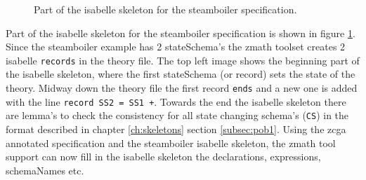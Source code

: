 \begin{figure}[H]
    \hfill
    \hfill
    \hfill
    \caption{Part of the isabelle skeleton for the steamboiler specification.\label{fig:steamisaskel}}
\end{figure}

Part of the isabelle skeleton for the steamboiler specification is shown in
figure \ref{fig:steamisaskel}. Since the steamboiler example has 2 stateSchema's
the \gls{zmath} toolset creates 2 isabelle 	\texttt{records} in the theory file.
The top left image shows the beginning part of the isabelle skeleton, where the
first stateSchema (or record) sets the state of the theory. Midway down the
theory file the first record \texttt{ends} and a new one is added with the line
\verb|record SS2 = SS1 +|. Towards the end the isabelle skeleton there are
lemma's to check the consistency for all state changing schema's (\texttt{CS})
in the format described in chapter \ref{ch:skeletons} section \ref{subsec:pob1}.
Using the \gls{zcga} annotated specification and the steamboiler isabelle
skeleton, the \gls{zmath} tool support can now fill in the isabelle skeleton the
declarations, expressions, schemaNames etc.

